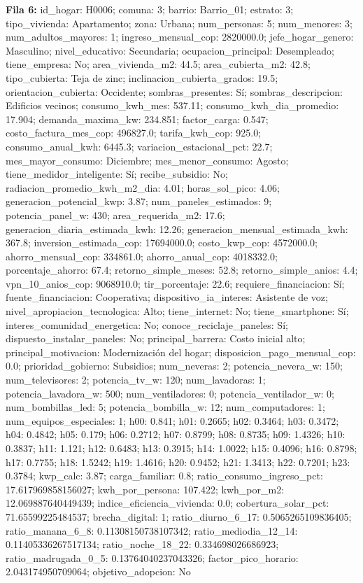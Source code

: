 {\footnotesize\textbf{Fila 6:} id\_hogar: H0006; comuna: 3; barrio: Barrio\_01; estrato: 3; tipo\_vivienda: Apartamento; zona: Urbana; num\_personas: 5; num\_menores: 3; num\_adultos\_mayores: 1; ingreso\_mensual\_cop: 2820000.0; jefe\_hogar\_genero: Masculino; nivel\_educativo: Secundaria; ocupacion\_principal: Desempleado; tiene\_empresa: No; area\_vivienda\_m2: 44.5; area\_cubierta\_m2: 42.8; tipo\_cubierta: Teja de zinc; inclinacion\_cubierta\_grados: 19.5; orientacion\_cubierta: Occidente; sombras\_presentes: Sí; sombras\_descripcion: Edificios vecinos; consumo\_kwh\_mes: 537.11; consumo\_kwh\_dia\_promedio: 17.904; demanda\_maxima\_kw: 234.851; factor\_carga: 0.547; costo\_factura\_mes\_cop: 496827.0; tarifa\_kwh\_cop: 925.0; consumo\_anual\_kwh: 6445.3; variacion\_estacional\_pct: 22.7; mes\_mayor\_consumo: Diciembre; mes\_menor\_consumo: Agosto; tiene\_medidor\_inteligente: Sí; recibe\_subsidio: No; radiacion\_promedio\_kwh\_m2\_dia: 4.01; horas\_sol\_pico: 4.06; generacion\_potencial\_kwp: 3.87; num\_paneles\_estimados: 9; potencia\_panel\_w: 430; area\_requerida\_m2: 17.6; generacion\_diaria\_estimada\_kwh: 12.26; generacion\_mensual\_estimada\_kwh: 367.8; inversion\_estimada\_cop: 17694000.0; costo\_kwp\_cop: 4572000.0; ahorro\_mensual\_cop: 334861.0; ahorro\_anual\_cop: 4018332.0; porcentaje\_ahorro: 67.4; retorno\_simple\_meses: 52.8; retorno\_simple\_anios: 4.4; vpn\_10\_anios\_cop: 9068910.0; tir\_porcentaje: 22.6; requiere\_financiacion: Sí; fuente\_financiacion: Cooperativa; dispositivo\_ia\_interes: Asistente de voz; nivel\_apropiacion\_tecnologica: Alto; tiene\_internet: No; tiene\_smartphone: Sí; interes\_comunidad\_energetica: No; conoce\_reciclaje\_paneles: Sí; dispuesto\_instalar\_paneles: No; principal\_barrera: Costo inicial alto; principal\_motivacion: Modernización del hogar; disposicion\_pago\_mensual\_cop: 0.0; prioridad\_gobierno: Subsidios; num\_neveras: 2; potencia\_nevera\_w: 150; num\_televisores: 2; potencia\_tv\_w: 120; num\_lavadoras: 1; potencia\_lavadora\_w: 500; num\_ventiladores: 0; potencia\_ventilador\_w: 0; num\_bombillas\_led: 5; potencia\_bombilla\_w: 12; num\_computadores: 1; num\_equipos\_especiales: 1; h00: 0.841; h01: 0.2665; h02: 0.3464; h03: 0.3472; h04: 0.4842; h05: 0.179; h06: 0.2712; h07: 0.8799; h08: 0.8735; h09: 1.4326; h10: 0.3837; h11: 1.121; h12: 0.6483; h13: 0.3915; h14: 1.0022; h15: 0.4096; h16: 0.8798; h17: 0.7755; h18: 1.5242; h19: 1.4616; h20: 0.9452; h21: 1.3413; h22: 0.7201; h23: 0.3784; kwp\_calc: 3.87; carga\_familiar: 0.8; ratio\_consumo\_ingreso\_pct: 17.617969858156027; kwh\_por\_persona: 107.422; kwh\_por\_m2: 12.069887640449439; indice\_eficiencia\_vivienda: 0.0; cobertura\_solar\_pct: 71.65599225484537; brecha\_digital: 1; ratio\_diurno\_6\_17: 0.5065265109836405; ratio\_manana\_6\_8: 0.11308150738107342; ratio\_mediodia\_12\_14: 0.11405336267517134; ratio\_noche\_18\_22: 0.334698026686923; ratio\_madrugada\_0\_5: 0.13764040237043326; factor\_pico\_horario: 2.043174950709064; objetivo\_adopcion: No\par}
